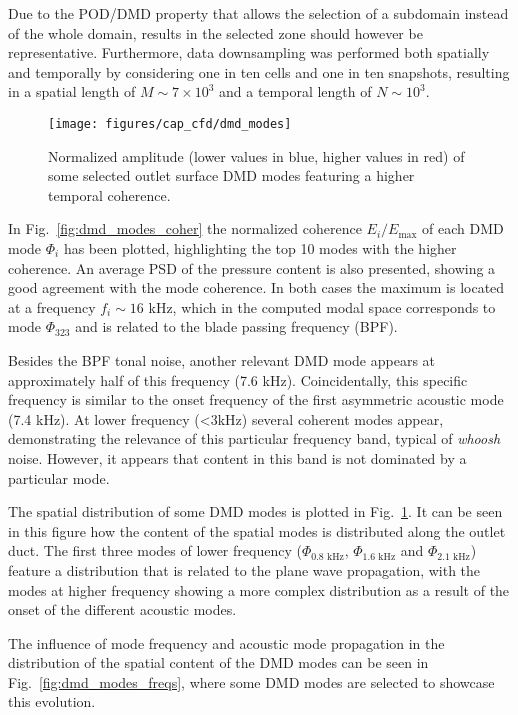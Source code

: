 Due to the POD/DMD property that allows the selection of a subdomain instead of the whole domain, results in the selected zone should however be representative. Furthermore, data downsampling was performed both spatially and temporally by considering one in ten cells and one in ten snapshots, resulting in a spatial length of $M\sim 7\times 10^3$ and a temporal length of $N\sim 10^3$.

\begin{figure}[hb!]
\centering
\texttt{[image: figures/cap\_cfd/dmd\_modes]}
\caption{Normalized amplitude (lower values in blue, higher values in red) of some selected outlet surface DMD modes featuring a higher temporal coherence.}
\label{fig:dmd_modes}
\end{figure}

In Fig.~\ref{fig:dmd_modes_coher} the normalized coherence $E_i/E_\text{max}$ of each DMD mode $\Phi_i$ has been plotted, highlighting the top 10 modes with the higher coherence. An average PSD of the pressure content is also presented, showing a good agreement with the mode coherence. In both cases the maximum is located at a frequency $f_i\sim 16$ kHz, which in the computed modal space corresponds to mode $\Phi_{323}$ and is related to the blade passing frequency (BPF).

Besides the BPF tonal noise, another relevant DMD mode appears at approximately half of this frequency (7.6 kHz). Coincidentally, this specific frequency is similar to the onset frequency of the first asymmetric acoustic mode (7.4 kHz). At lower frequency (<3kHz) several coherent modes appear, demonstrating the relevance of this particular frequency band, typical of \emph{whoosh} noise. However, it appears that content in this band is not dominated by a particular mode.

The spatial distribution of some DMD modes is plotted in Fig.~\ref{fig:dmd_modes}. It can be seen in this figure how the content of the spatial modes is distributed along the outlet duct. The first three modes of lower frequency ($\Phi_\text{0.8 kHz}$, $\Phi_\text{1.6 kHz}$ and $\Phi_\text{2.1 kHz}$) feature a distribution that is related to the plane wave propagation, with the modes at higher frequency showing a more complex distribution as a result of the onset of the different acoustic modes.

The influence of mode frequency and acoustic mode propagation in the distribution of the spatial content of the DMD modes can be seen in Fig.~\ref{fig:dmd_modes_freqs}, where some DMD modes are selected to showcase this evolution. 

